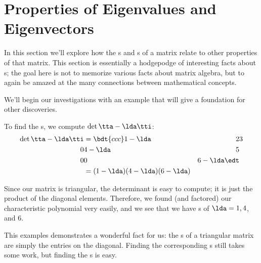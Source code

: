 \section{Properties of Eigenvalues and Eigenvectors}\label{sec:eigen_prop}


In this section we'll explore how the \el s and \ev s of a matrix relate to other properties of that matrix. This section is essentially a hodgepodge of interesting facts about \el s; the goal here is not to memorize various facts about matrix algebra, but to again be amazed at the many connections between mathematical concepts.

We'll begin our investigations with an example that will give a foundation for other discoveries.

\medskip

{To find the \el s, we compute $\det{\tta-\lda\tti}$:
\begin{align*}
\det{\tta-\lda\tti}	&=	\bdt{ccc} 1-\lda & 2&3\\0&4-\lda&5\\0&0&6-\lda \edt\\
										&= (1-\lda)(4-\lda)(6-\lda)
\end{align*}

Since our matrix is triangular, the determinant is easy to compute; it is just the product of the diagonal elements. Therefore, we found (and factored) our characteristic polynomial very easily, and we see that we have \el s of $\lda = 1, 4$, and 6.}

\medskip

This examples demonstrates a wonderful fact for us: the \el s of a triangular matrix are simply the entries on the diagonal. Finding the corresponding \ev s still takes some work, but finding the \el s is easy.

